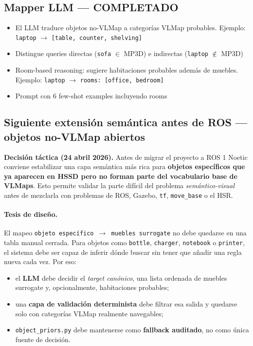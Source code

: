 \documentclass[11pt,a4paper]{article}
\begin{document}
\subsection{Mapper LLM --- \textcolor{done}{COMPLETADO}}

\begin{itemize}
  \item[\checkmark] El LLM traduce objetos no-VLMap a categorías VLMap probables.
        Ejemplo: \texttt{laptop} $\rightarrow$ \texttt{[table, counter, shelving]}
  \item[\checkmark] Distingue queries directas (\texttt{sofa} $\in$ MP3D) e indirectas
        (\texttt{laptop} $\notin$ MP3D)
  \item[\checkmark] Room-based reasoning: sugiere habitaciones probables además de muebles.
        Ejemplo: \texttt{laptop} $\rightarrow$ \texttt{rooms: [office, bedroom]}
  \item[\checkmark] Prompt con 6 few-shot examples incluyendo rooms
\end{itemize}

\subsection{Siguiente extensión semántica antes de ROS --- objetos no-VLMap abiertos}

\textbf{Decisión táctica (24 abril 2026).} Antes de migrar el proyecto a ROS 1
Noetic conviene estabilizar una capa semántica más rica para \textbf{objetos
específicos que ya aparecen en HSSD pero no forman parte del vocabulario base
de VLMaps}. Esto permite validar la parte difícil del problema
\emph{semántico-visual} antes de mezclarla con problemas de ROS, Gazebo,
\texttt{tf}, \texttt{move\_base} o el HSR.

\paragraph{Tesis de diseño.} El mapeo
\texttt{objeto específico $\rightarrow$ muebles surrogate} no debe quedarse en
una tabla manual cerrada. Para objetos como \texttt{bottle},
\texttt{charger}, \texttt{notebook} o \texttt{printer}, el sistema debe ser
capaz de inferir dónde buscar sin tener que añadir una regla nueva cada vez.
Por eso:
\begin{itemize}
  \item el \textbf{LLM} debe decidir el \emph{target canónico}, una lista
        ordenada de muebles surrogate y, opcionalmente, habitaciones probables;
  \item una \textbf{capa de validación determinista} debe filtrar esa salida y
        quedarse solo con categorías VLMap realmente navegables;
  \item \texttt{object\_priors.py} debe mantenerse como \textbf{fallback
        auditado}, no como única fuente de decisión.
\end{itemize}
\end{document}
